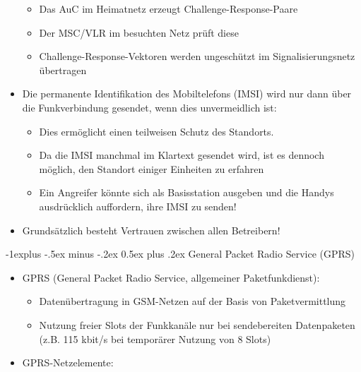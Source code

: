 \documentclass[a4paper]{article}
\makeatletter
\renewcommand{\subsection}{\@startsection{subsection}{2}{0mm}%
 {-1explus -.5ex minus -.2ex}%
 {0.5ex plus .2ex}%
 {\normalfont\normalsize\bfseries}}
\makeatother
\begin{document}
\begin{multicols}{3}
\begin{itemize}
              \begin{itemize}
                  \item
                        Das AuC im Heimatnetz erzeugt Challenge-Response-Paare
                  \item
                        Der MSC/VLR im besuchten Netz prüft diese
                  \item
                        Challenge-Response-Vektoren werden ungeschützt im
                        Signalisierungsnetz übertragen
              \end{itemize}
        \item
              Die permanente Identifikation des Mobiltelefons (IMSI) wird nur dann
              über die Funkverbindung gesendet, wenn dies unvermeidlich ist:

              \begin{itemize}
                  \item
                        Dies ermöglicht einen teilweisen Schutz des Standorts.
                  \item
                        Da die IMSI manchmal im Klartext gesendet wird, ist es dennoch
                        möglich, den Standort einiger Einheiten zu erfahren
                  \item
                        Ein Angreifer könnte sich als Basisstation ausgeben und die Handys
                        ausdrücklich auffordern, ihre IMSI zu senden!
              \end{itemize}
        \item
              Grundsätzlich besteht Vertrauen zwischen allen Betreibern!
    \end{itemize}


    \subsection{General Packet Radio Service
        (GPRS)}

    \begin{itemize}
        \item
              GPRS (General Packet Radio Service, allgemeiner Paketfunkdienst):

              \begin{itemize}
                  \item
                        Datenübertragung in GSM-Netzen auf der Basis von Paketvermittlung
                  \item
                        Nutzung freier Slots der Funkkanäle nur bei sendebereiten
                        Datenpaketen (z.B. 115 kbit/s bei temporärer Nutzung von 8 Slots)
              \end{itemize}
        \item
              GPRS-Netzelemente:


\end{itemize}
\end{multicols}
\end{document}
